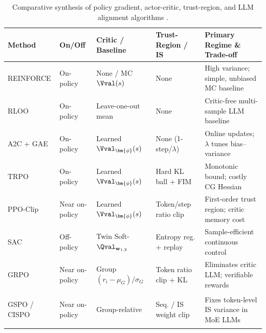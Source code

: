 \documentclass[../../../../master.tex]{subfiles}
\begin{document}
\begin{table}[htbp]
\centering
\caption{Comparative synthesis of policy gradient, actor-critic, trust-region, and LLM alignment algorithms  .}
\label{tab:pg:comparison}
\footnotesize
\begin{tabularx}{\textwidth}{@{}>{\bfseries\raggedright\arraybackslash}p{2.3cm} >{\raggedright\arraybackslash}p{1.9cm} >{\raggedright\arraybackslash}p{2.5cm} >{\raggedright\arraybackslash}p{2.4cm} X@{}}
\toprule
Method & On/Off & Critic / Baseline & Trust-Region / IS & Primary Regime \& Trade-off \\
\midrule
REINFORCE & On-policy & None / MC $\Vval(s)$ & None & High variance; simple, unbiased MC baseline \\
RLOO & On-policy & Leave-one-out mean & None & Critic-free multi-sample LLM baseline \\
A2C + GAE & On-policy & Learned $\Vval_{\bm{\phi}}(s)$ & None (1-step/$\lambda$) & Online updates; $\lambda$ tunes bias--variance \\
TRPO & On-policy & Learned $\Vval_{\bm{\phi}}(s)$ & Hard KL ball + FIM & Monotonic bound; costly CG Hessian \\
PPO-Clip & Near on-policy & Learned $\Vval_{\bm{\phi}}(s)$ & Token/step ratio clip & First-order trust region; critic memory cost \\
SAC & Off-policy & Twin Soft-$\Qval_{\mathbf{w}_{1,2}}$ & Entropy reg. + replay & Sample-efficient continuous control \\
GRPO & Near on-policy & Group $(r_i - \mu_G)/\sigma_G$ & Token ratio clip + KL & Eliminates critic LLM; verifiable rewards \\
GSPO / CISPO & Near on-policy & Group-relative & Seq. / IS weight clip & Fixes token-level IS variance in MoE LLMs \\
\bottomrule
\end{tabularx}
\end{table}
\end{document}
